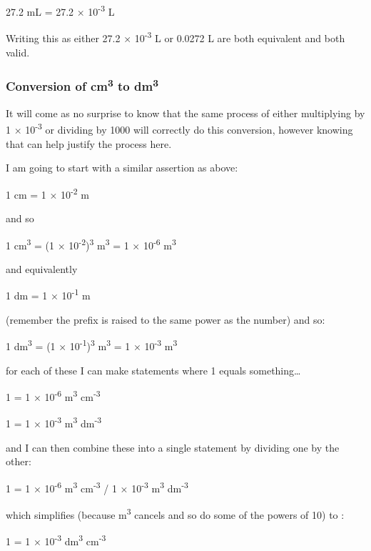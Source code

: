 \documentclass[
]{book}
\begin{document}
27.2 mL = 27.2 × 10\textsuperscript{-3} L

Writing this as either 27.2 × 10\textsuperscript{-3} L or 0.0272 L are both equivalent and both valid.

\hypertarget{conversion-of-cm3-to-dm3}{%
\subsubsection{\texorpdfstring{Conversion of cm\textsuperscript{3} to dm\textsuperscript{3}}{Conversion of cm3 to dm3}}\label{conversion-of-cm3-to-dm3}}

It will come as no surprise to know that the same process of either multiplying by 1 × 10\textsuperscript{-3} or dividing by 1000 will correctly do this conversion, however knowing that can help justify the process here.

I am going to start with a similar assertion as above:

1 cm = 1 × 10\textsuperscript{-2} m

and so

1 cm\textsuperscript{3} = (1 × 10\textsuperscript{-2})\textsuperscript{3} m\textsuperscript{3} = 1 × 10\textsuperscript{-6} m\textsuperscript{3}

and equivalently

1 dm = 1 × 10\textsuperscript{-1} m

(remember the prefix is raised to the same power as the number) and so:

1 dm\textsuperscript{3} = (1 × 10\textsuperscript{-1})\textsuperscript{3} m\textsuperscript{3} = 1 × 10\textsuperscript{-3} m\textsuperscript{3}

for each of these I can make statements where 1 equals something\ldots{}

1 = 1 × 10\textsuperscript{-6} m\textsuperscript{3} cm\textsuperscript{-3}

1 = 1 × 10\textsuperscript{-3} m\textsuperscript{3} dm\textsuperscript{-3}

and I can then combine these into a single statement by dividing one by the other:

1 = 1 × 10\textsuperscript{-6} m\textsuperscript{3} cm\textsuperscript{-3} / 1 × 10\textsuperscript{-3} m\textsuperscript{3} dm\textsuperscript{-3}

which simplifies (because m\textsuperscript{3} cancels and so do some of the powers of 10) to :

1 = 1 × 10\textsuperscript{-3} dm\textsuperscript{3} cm\textsuperscript{-3}
\end{document}
